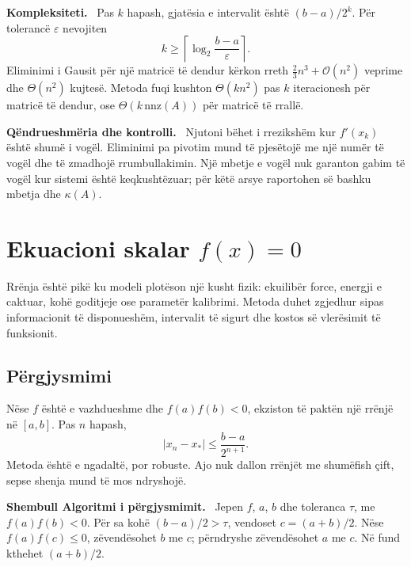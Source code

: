 \documentclass[11pt,oneside,openany]{book}
\newcommand{\Oh}{\mathcal{O}}
\newenvironment{shembull}[1][]{\par\medskip\noindent\textbf{Shembull #1.}\ }{\par\medskip}
\newenvironment{kompleksitet}{\par\medskip\noindent\textbf{Kompleksiteti.}\ }{\par\medskip}
\newenvironment{qendrueshmeri}{\par\medskip\noindent\textbf{Qëndrueshmëria dhe kontrolli.}\ }{\par\medskip}
\begin{document}
\begin{kompleksitet}
Pas $k$ hapash, gjatësia e intervalit është $(b-a)/2^k$. Për tolerancë
$\varepsilon$ nevojiten
\begin{equation}
 k\geq\left\lceil\log_2\frac{b-a}{\varepsilon}\right\rceil.
\end{equation}
Eliminimi i Gausit për një matricë të dendur kërkon rreth
$\tfrac23n^3+\Oh(n^2)$ veprime dhe $\Theta(n^2)$ kujtesë. Metoda fuqi kushton
$\Theta(kn^2)$ pas $k$ iteracionesh për matricë të dendur, ose
$\Theta(k\,\mathrm{nnz}(A))$ për matricë të rrallë.
\end{kompleksitet}

\begin{qendrueshmeri}
Njutoni bëhet i rrezikshëm kur $f'(x_k)$ është shumë i vogël. Eliminimi pa
pivotim mund të pjesëtojë me një numër të vogël dhe të zmadhojë rrumbullakimin.
Një mbetje e vogël nuk garanton gabim të vogël kur sistemi është
keqkushtëzuar; për këtë arsye raportohen së bashku mbetja dhe $\kappa(A)$.
\end{qendrueshmeri}



\section{Ekuacioni skalar $f(x)=0$}
Rrënja është pikë ku modeli plotëson një kusht fizik: ekuilibër force, energji e caktuar, kohë goditjeje ose parametër kalibrimi. Metoda duhet zgjedhur sipas informacionit të disponueshëm, intervalit të sigurt dhe kostos së vlerësimit të funksionit.

\subsection{Përgjysmimi}
Nëse $f$ është e vazhdueshme dhe $f(a)f(b)<0$, ekziston të paktën një rrënjë në $[a,b]$. Pas $n$ hapash,
\begin{equation}
 |x_n-x_*|\le \frac{b-a}{2^{n+1}}.
\end{equation}
Metoda është e ngadaltë, por robuste. Ajo nuk dallon rrënjët me shumëfish çift, sepse shenja mund të mos ndryshojë.

\begin{shembull}[Algoritmi i përgjysmimit]
Jepen $f$, $a$, $b$ dhe toleranca $\tau$, me $f(a)f(b)<0$. Për sa kohë $(b-a)/2>\tau$, vendoset $c=(a+b)/2$. Nëse $f(a)f(c)\le0$, zëvendësohet $b$ me $c$; përndryshe zëvendësohet $a$ me $c$. Në fund kthehet $(a+b)/2$.
\end{shembull}
\end{document}
